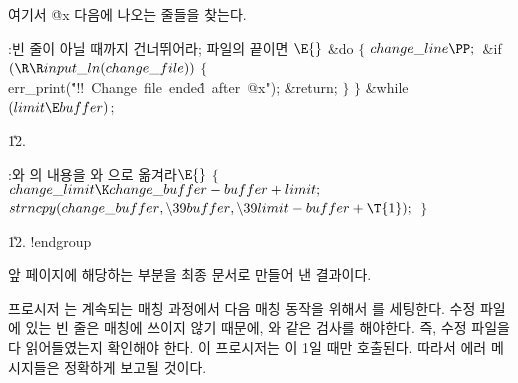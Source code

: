 {여기서 \.{@x} 다음에 나오는 줄들을 찾는다.

\Y\B\4:빈 줄이 아닐 때까지 건너뛰어라; 파일의 끝이면 \X${}\E{}$\6
\&{do}\5
${}\{{}$\1\6
${}\\{change\_line}\PP;{}$\6
\&{if} ${}(\R\R\\{input\_ln}(\\{change\_file})){}$\5
${}\{{}$\1\6
\\{err\_print}(\.{"!!\ Change\ file\ ende}\)\.{d\ after\ @x"});\6
\&{return};\6
\4${}\}{}$\2\6
\4${}\}{}$\2\5
\&{while} ${}(\\{limit}\E\\{buffer}){}$;\par
\U12.\fi

\B{}:와 의 내용을 와 으로 옮겨라\X${}\E{}$\6
${}\{{}$\1\6
${}\\{change\_limit}\K\\{change\_buffer}-\\{buffer}+\\{limit};{}$\6
${}\\{strncpy}(\\{change\_buffer},\39\\{buffer},\39\\{limit}-\\{buffer}+%
\T{1});{}$\6
\4${}\}{}$\2\par\U12.\fi
!endgroup
\endgroup
\vfil\eject

\def\inote#1#2#3.{\Y\noindent{\hangindent2em%
  \baselineskip10pt\eightrm\hfont{nanummjm}{at 7pt}%
    #1~\ifacro{\pdfnote#3.}\else#3\fi#2.\par}}
\def\U{\inote{이 코드는}{번 섹션에서 사용됩니다}}

\def\runninghead{\headlinefont 부록 A --- 최종 문서}

앞 페이지에 해당하는 부분을 최종 문서로 만들어 낸 결과이다.

{
\baselineskip13pt 
프로시저 는 계속되는 매칭 과정에서 다음 
매칭 동작을 위해서 를 세팅한다. 수정 파일에 있는 빈 줄은 매칭에
쓰이지 않기 때문에, 와 같은 검사를 해야한다. 즉, 수정 파일을 다 읽어들였는지 확인해야 한다. 
이 프로시저는 이 1일 때만 호출된다. 
따라서 에러 메시지들은 정확하게 보고될 것이다.

}}
